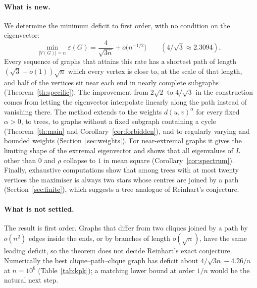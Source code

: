\documentclass[11pt,a4paper]{article}
\theoremstyle{definition}
\newcommand{\eps}{\varepsilon}
\begin{document}
\paragraph{What is new.}
We determine the minimum deficit to first order, with no condition on the eigenvector:
\[
 \min_{|V(G)|=n}\eps(G)=\frac{4}{\sqrt{3n}}+o\big(n^{-1/2}\big)\qquad(4/\sqrt3\approx2.3094).
\]
Every sequence of graphs that attains this rate has a shortest path of length $(\sqrt3+o(1))\sqrt n$ which every vertex is close to, at the scale of that length, and half of the vertices sit near each end in nearly complete subgraphs (Theorem~\ref{th:specific}). The improvement from $2\sqrt2$ to $4/\sqrt3$ in the construction comes from letting the eigenvector interpolate linearly along the path instead of vanishing there. The method extends to the weights $d(u,v)^\alpha$ for every fixed $\alpha>0$, to trees, to graphs without a fixed subgraph containing a cycle (Theorem~\ref{th:main} and Corollary~\ref{cor:forbidden}), and to regularly varying and bounded weights (Section~\ref{sec:weights}). For near-extremal graphs it gives the limiting shape of the extremal eigenvector and shows that all eigenvalues of $L$ other than $0$ and $\rho$ collapse to $1$ in mean square (Corollary~\ref{cor:spectrum}). Finally, exhaustive computations show that among trees with at most twenty vertices the maximiser is always two stars whose centres are joined by a path (Section~\ref{sec:finite}), which suggests a tree analogue of Reinhart's conjecture.

\paragraph{What is not settled.}
The result is first order. Graphs that differ from two cliques joined by a path by $o(n^2)$ edges inside the ends, or by branches of length $o(\sqrt n)$, have the same leading deficit, so the theorem does not decide Reinhart's exact conjecture. Numerically the best clique--path--clique graph has deficit about $4/\sqrt{3n}-4.26/n$ at $n=10^6$ (Table~\ref{tab:kpk}); a matching lower bound at order $1/n$ would be the natural next step.
\end{document}
